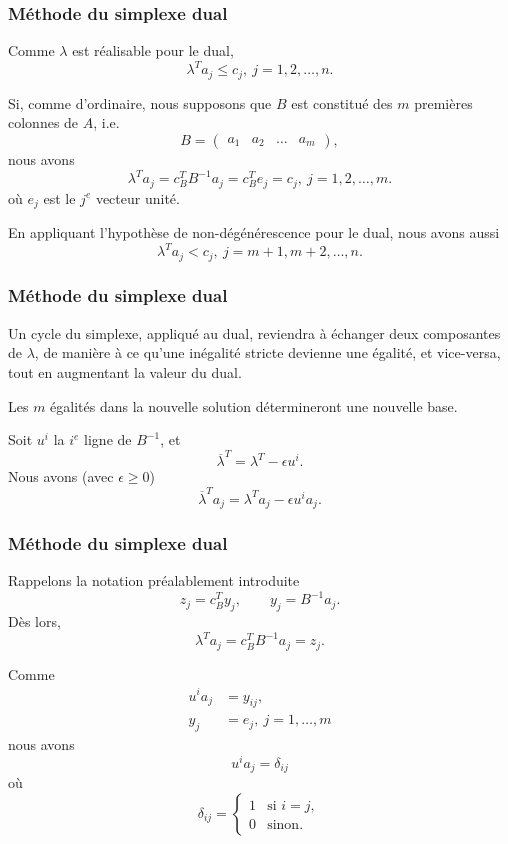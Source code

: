 \documentclass[usepdftitle=false]{beamer}
\begin{document}
\begin{frame}
	\frametitle{Méthode du simplexe dual}
	
	Comme $\lambda$ est réalisable pour le dual,
	\[
	\lambda^T a_j \leq c_j,\ j = 1, 2, \ldots, n.
	\]
	
	\mbox{}
	
	Si, comme d'ordinaire, nous supposons que $B$ est constitué des $m$ premières colonnes de $A$, i.e.
	\[
	B = \begin{pmatrix}
		a_1 & a_2 & \ldots & a_m
	\end{pmatrix},
	\]
	nous avons
	\[
	\lambda^T a_j = c_B^T B^{-1} a_j = c_B^T e_j = c_j,\ j = 1, 2, \ldots, m.
	\]
	où $e_j$ est le $j^e$ vecteur unité.
	
	\mbox{}
	
	En appliquant l'hypothèse de non-dégénérescence pour le dual, nous avons aussi
	\[
	\lambda^T a_j < c_j,\ j = m+1, m+2, \ldots, n.
	\]
	
\end{frame}

\begin{frame}
	\frametitle{Méthode du simplexe dual}
	
	Un cycle du simplexe, appliqué au dual, reviendra à échanger deux composantes de $\lambda$, de manière à ce qu'une inégalité stricte devienne une égalité, et vice-versa, tout en augmentant la valeur du dual.
	
	\mbox{}
	
	Les $m$ égalités dans la nouvelle solution détermineront une nouvelle base.
	
	\mbox{}
	
	Soit $u^i$ la $i^e$ ligne de $B^{-1}$, et
	\[
	\overline{\lambda}^T = \lambda^T - \epsilon u^i.
	\]
	Nous avons (avec $\epsilon \geq 0$)
	\[
	\overline{\lambda}^T a_j = \lambda^T a_j - \epsilon u^i a_j.
	\]
	
\end{frame}

\begin{frame}
	\frametitle{Méthode du simplexe dual}
	
	Rappelons la notation préalablement introduite
	\[
	z_j = c_B^T y_j,\qquad y_j = B^{-1}a_j.
	\]
	Dès lors,
	\[
	\lambda^T a_j = c_B^T B^{-1} a_j = z_j.
	\]
	
	\mbox{}
	
	Comme
	\begin{align*}
		u^i a_j &= y_{ij},\\
		y_j &= e_j,\ j = 1,\ldots,m
	\end{align*}
	nous avons
	\[
	u^i a_j = \delta_{ij}
	\]
	où
	\[
	\delta_{ij} =
	\begin{cases}
		1 & \mbox{si } i = j,\\
		0 & \mbox{sinon}.
	\end{cases}
	\]
	
\end{frame}
\end{document}
